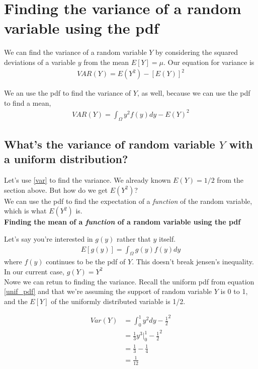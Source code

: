 \documentclass{article}
\begin{document}
\section{Finding the variance of a random variable using the pdf}

We can find the variance of a random variable $Y$ by considering the squared deviations of a variable $y$ from the mean $ E[Y] = \mu$. Our equation for variance is 
\begin{align}
    VAR(Y) = E(Y^2) -[E(Y)]^2 
\end{align}

We an use the pdf to find the variance of $Y$, as well, because we can use the pdf to find a mean,
\begin{align}
        VAR(Y) = \int_\Omega y^2 f(y) dy - E(Y)^2 \label{var}
\end{align}


\subsection{What's the variance of random variable $Y$ with a uniform distribution?}
Let's use \ref{var} to find the variance. We already known $E(Y) = 1/2$ from the section above. But how do we get $E(Y^2)$?\\

We can use the pdf to find the expectation of a \textit{function} of the random variable, which is what $E(Y^2)$ is. \\

\textbf{Finding the mean of a \textit{function} of a random variable using the pdf}

Let's say you're  interested in $g(y)$ rather that $y$ itself.
\begin{align}
    E[g(y)] = \int_\Omega g(y) f(y) dy
\end{align}
where $f(y)$ continues to be the pdf of $Y$. This doesn't break jensen's inequality. \\

In our current case, $g(Y) = Y^2$\\ 
 
Nowe we can retun to finding the variance. Recall the uniform pdf from equation \ref{unif_pdf} and that we're assuming the support of random variable $Y$ is 0 to 1, and the $E[Y]$ of the uniformly distributed variable is 1/2.

\begin{align}
    Var(Y) &= \int_0^1 y^2 dy - \frac{1}{2}^2\\
    &= \frac{1}{3}y^3 \bigg|_0^1  -  \frac{1}{2}^2  \\
    &= \frac{1}{3} - \frac{1}{4} \\
    &= \frac{1}{12}
\end{align}
\end{document}

